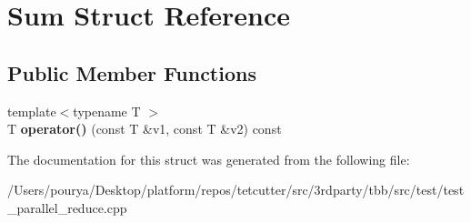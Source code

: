 \hypertarget{structSum}{}\section{Sum Struct Reference}
\label{structSum}
\subsection*{Public Member Functions}
\begin{DoxyCompactItemize}
\item 
\hypertarget{structSum_af9b791afcf7ad61967cd337ba702b0c5}{}{\footnotesize template$<$typename T $>$ }\\T {\bfseries operator()} (const T \&v1, const T \&v2) const \label{structSum_af9b791afcf7ad61967cd337ba702b0c5}

\end{DoxyCompactItemize}


The documentation for this struct was generated from the following file\+:\begin{DoxyCompactItemize}
\item 
/\+Users/pourya/\+Desktop/platform/repos/tetcutter/src/3rdparty/tbb/src/test/test\+\_\+parallel\+\_\+reduce.\+cpp\end{DoxyCompactItemize}
